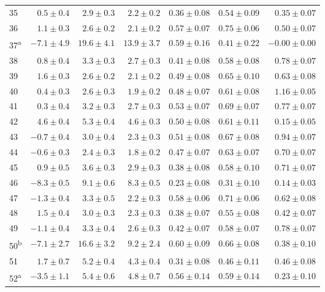 \begin{tabular}{l r r r r r r}
35 & $0.5 \pm 0.4$ & $2.9 \pm 0.3$ & $2.2 \pm 0.2$ & $0.36 \pm 0.08$ & $0.54 \pm 0.09$ & $0.35 \pm 0.07$ \\ 
36 & $1.1 \pm 0.3$ & $2.6 \pm 0.2$ & $2.1 \pm 0.2$ & $0.57 \pm 0.07$ & $0.75 \pm 0.06$ & $0.50 \pm 0.07$ \\ 
37\textsuperscript{a} & $-7.1 \pm 4.9$ & $19.6 \pm 4.1$ & $13.9 \pm 3.7$ & $0.59 \pm 0.16$ & $0.41 \pm 0.22$ & $-0.00 \pm 0.00$ \\ 
38 & $0.8 \pm 0.4$ & $3.3 \pm 0.3$ & $2.7 \pm 0.3$ & $0.41 \pm 0.08$ & $0.58 \pm 0.08$ & $0.78 \pm 0.07$ \\ 
39 & $1.6 \pm 0.3$ & $2.6 \pm 0.2$ & $2.1 \pm 0.2$ & $0.49 \pm 0.08$ & $0.65 \pm 0.10$ & $0.63 \pm 0.08$ \\ 
40 & $0.4 \pm 0.3$ & $2.6 \pm 0.3$ & $1.9 \pm 0.2$ & $0.48 \pm 0.07$ & $0.61 \pm 0.08$ & $1.16 \pm 0.05$ \\ 
41 & $0.3 \pm 0.4$ & $3.2 \pm 0.3$ & $2.7 \pm 0.3$ & $0.53 \pm 0.07$ & $0.69 \pm 0.07$ & $0.77 \pm 0.07$ \\ 
42 & $4.6 \pm 0.4$ & $5.3 \pm 0.4$ & $4.6 \pm 0.3$ & $0.50 \pm 0.08$ & $0.61 \pm 0.11$ & $0.15 \pm 0.05$ \\ 
43 & $-0.7 \pm 0.4$ & $3.0 \pm 0.4$ & $2.3 \pm 0.3$ & $0.51 \pm 0.08$ & $0.67 \pm 0.08$ & $0.94 \pm 0.07$ \\ 
44 & $-0.6 \pm 0.3$ & $2.4 \pm 0.3$ & $1.8 \pm 0.2$ & $0.47 \pm 0.07$ & $0.63 \pm 0.07$ & $0.70 \pm 0.07$ \\ 
45 & $0.9 \pm 0.5$ & $3.6 \pm 0.3$ & $2.9 \pm 0.3$ & $0.38 \pm 0.08$ & $0.58 \pm 0.10$ & $0.71 \pm 0.07$ \\ 
46 & $-8.3 \pm 0.5$ & $9.1 \pm 0.6$ & $8.3 \pm 0.5$ & $0.23 \pm 0.08$ & $0.31 \pm 0.10$ & $0.14 \pm 0.03$ \\ 
47 & $-1.3 \pm 0.4$ & $3.3 \pm 0.5$ & $2.2 \pm 0.3$ & $0.58 \pm 0.06$ & $0.71 \pm 0.06$ & $0.62 \pm 0.08$ \\ 
48 & $1.5 \pm 0.4$ & $3.0 \pm 0.3$ & $2.3 \pm 0.3$ & $0.38 \pm 0.07$ & $0.55 \pm 0.08$ & $0.42 \pm 0.07$ \\ 
49 & $-1.1 \pm 0.4$ & $3.3 \pm 0.4$ & $2.6 \pm 0.3$ & $0.42 \pm 0.07$ & $0.58 \pm 0.07$ & $0.78 \pm 0.07$ \\ 
50\textsuperscript{b} & $-7.1 \pm 2.7$ & $16.6 \pm 3.2$ & $9.2 \pm 2.4$ & $0.60 \pm 0.09$ & $0.66 \pm 0.08$ & $0.38 \pm 0.10$ \\ 
51 & $1.7 \pm 0.7$ & $5.2 \pm 0.4$ & $4.3 \pm 0.4$ & $0.31 \pm 0.08$ & $0.46 \pm 0.11$ & $0.46 \pm 0.08$ \\ 
52\textsuperscript{a} & $-3.5 \pm 1.1$ & $5.4 \pm 0.6$ & $4.8 \pm 0.7$ & $0.56 \pm 0.14$ & $0.59 \pm 0.14$ & $0.23 \pm 0.10$ \\ 

\end{tabular}
